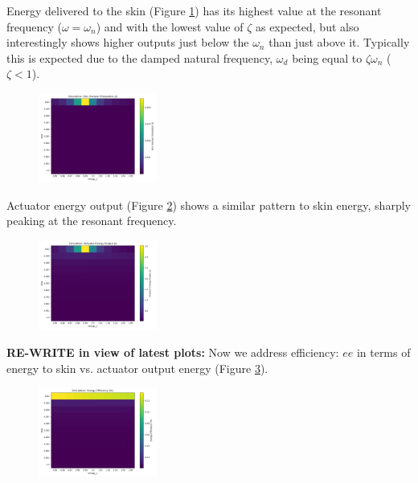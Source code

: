 \documentclass[letterpaper,11pt]{article}
\begin{document}
Energy delivered to the skin (Figure \ref{SkinEFig}) has its highest value at the resonant
frequency ($\omega=\omega_n$) and with the lowest value of
$\zeta$ as expected, but also interestingly shows higher outputs
just below the $\omega_n$ than just above it.  Typically this is expected
due to the damped natural frequency, $\omega_d$ being equal to $\zeta\omega_n$ ($\zeta<1$).



\begin{figure}
\includegraphics[width=0.35\textwidth]{heatmap_SkinE_11x11.png}
\caption{}\label{SkinEFig}
\end{figure}

Actuator energy output  (Figure \ref{EoutFig}) shows a similar pattern to skin energy,
sharply peaking at the resonant frequency.


\begin{figure}
\includegraphics[width=0.35\textwidth]{heatmap_actOutput_11x11.png}
\caption{}\label{EoutFig}
\end{figure}

{\bf RE-WRITE in view of latest plots: }
Now we address efficiency: $ee$ in terms of energy to skin vs. actuator output energy
(Figure \ref{EEficFig}).



\begin{figure}
\includegraphics[width=0.35\textwidth]{heatmap_ee_11x11.png}
\caption{}\label{EEficFig}
\end{figure}
\end{document}
